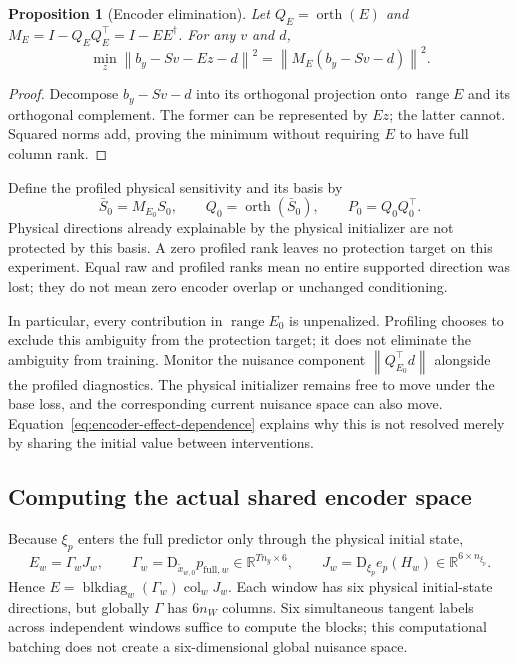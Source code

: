 \documentclass[11pt,a4paper]{article}
\newcommand{\R}{\mathbb R}
\newcommand{\D}{\mathrm D}
\newcommand{\ran}{\operatorname{range}}
\newcommand{\orth}{\operatorname{orth}}
\newcommand{\blkdiag}{\operatorname{blkdiag}}
\newcommand{\col}{\operatorname{col}}
\newcommand{\norm}[1]{\left\lVert#1\right\rVert}
\newcommand{\full}{\mathrm{full}}
\newtheorem{proposition}{Proposition}[section]
\theoremstyle{remark}
\begin{document}
\begin{proposition}[Encoder elimination]\label{prop:profile}
Let $Q_E=\orth(E)$ and $M_E=I-Q_EQ_E^\top=I-EE^\dagger$. For any $v$ and $d$,
\begin{equation}\label{eq:profileidentity}
 \min_z\norm{b_y-Sv-Ez-d}^2=\norm{M_E(b_y-Sv-d)}^2.
\end{equation}
\end{proposition}
\begin{proof}
Decompose $b_y-Sv-d$ into its orthogonal projection onto $\ran E$ and its orthogonal complement. The former can be represented by $Ez$; the latter cannot. Squared norms add, proving the minimum without requiring $E$ to have full column rank.
\end{proof}
Define the profiled physical sensitivity and its basis by
\begin{equation}\label{eq:Q}
 \bar S_0=M_{E_0}S_0,\qquad Q_0=\orth(\bar S_0),\qquad P_0=Q_0Q_0^\top.
\end{equation}
Physical directions already explainable by the physical initializer are not protected by this basis. A zero profiled rank leaves no protection target on this experiment. Equal raw and profiled ranks mean no entire supported direction was lost; they do not mean zero encoder overlap or unchanged conditioning.

In particular, every contribution in $\ran E_0$ is unpenalized. Profiling chooses to exclude this ambiguity from the protection target; it does not eliminate the ambiguity from training. Monitor the nuisance component $\norm{Q_{E_0}^\top d}$ alongside the profiled diagnostics. The physical initializer remains free to move under the base loss, and the corresponding current nuisance space can also move. Equation~\eqref{eq:encoder-effect-dependence} explains why this is not resolved merely by sharing the initial value between interventions.

\subsection{Computing the actual shared encoder space}
Because $\xi_p$ enters the full predictor only through the physical initial state,
\begin{equation}\label{eq:chainencoder}
 E_w=\Gamma_wJ_w,\qquad
 \Gamma_w=\D_{\tilde x_{w,0}}p_{\full,w}\in\R^{Tn_y\times6},\qquad
 J_w=\D_{\xi_p}e_p(H_w)\in\R^{6\times n_{\xi_p}}.
\end{equation}
Hence $E=\blkdiag_w(\Gamma_w)\col_wJ_w$. Each window has six physical initial-state directions, but globally $\Gamma$ has $6n_W$ columns. Six simultaneous tangent labels across independent windows suffice to compute the blocks; this computational batching does not create a six-dimensional global nuisance space.
\end{document}
